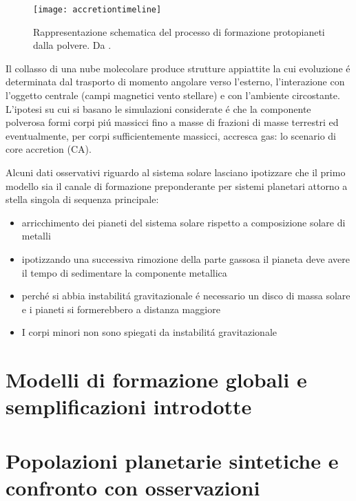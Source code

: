 \documentclass[twoside,11pt,fleqn]{memoir}%
\begin{document}
\begin{reworking}
\begin{figure}[!ht]
	\texttt{[image: accretiontimeline]}\caption{Rappresentazione schematica del processo di formazione protopianeti dalla polvere. Da \cite{perryman2011exoplanet}.}\label{fig:accretiontimeline}
\end{figure}
Il collasso di una nube molecolare produce strutture appiattite la cui evoluzione \'e determinata dal trasporto di momento angolare verso l'esterno, l'interazione con l'oggetto centrale (campi magnetici vento stellare) e con l'ambiente circostante.
L'ipotesi su cui si basano le simulazioni considerate \'e che la componente polverosa formi corpi pi\'u massicci fino a masse di frazioni di masse terrestri  ed eventualmente, per corpi sufficientemente massicci, accresca gas: lo scenario di core accretion (CA).
\end{reworking}

Alcuni dati osservativi riguardo al sistema solare lasciano ipotizzare che il primo modello sia il canale di formazione preponderante per sistemi planetari attorno a stella singola di sequenza principale:
\begin{itemize}
\item arricchimento dei pianeti del sistema solare rispetto a composizione solare di metalli%
\item ipotizzando una successiva rimozione della parte gassosa il pianeta deve avere il tempo di sedimentare la componente metallica
\item perch\'e si abbia instabilit\'a gravitazionale \'e necessario un disco di massa solare e i pianeti si formerebbero a distanza maggiore
\item I corpi minori non sono spiegati da instabilit\'a gravitazionale
\end{itemize}


\cleartorecto

{\let\clearpage\relax\let\cleardoublepage\relax
\part{Modelli di formazione globali e semplificazioni introdotte}\label{part:GFM}
}

\cleartorecto

{\let\clearpage\relax\let\cleardoublepage\relax
\part{Popolazioni planetarie sintetiche e confronto con osservazioni}
}
\end{document}
